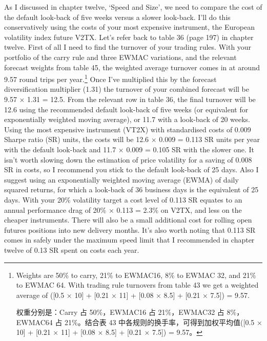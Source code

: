 \begin{englishblock} As I discussed in chapter twelve, ‘Speed and Size', we need to compare the cost of the default look-back of five weeks versus a slower look-back. I'll do this conservatively using the costs of your most expensive instrument, the European volatility index future V2TX. Let's refer back to table 36 (page 197) in chapter twelve. First of all I need to find the turnover of your trading rules. With your portfolio of the carry rule and three EWMAC variations, and the relevant forecast weights from table 45, the weighted average turnover comes in at around 9.57 round trips per year.\footnote{Weights are 50\% to carry, 21\% to EWMAC16, 8\% to EWMAC 32, and 21\% to EWMAC 64. With trading rule turnovers from table 43 we get a weighted average of ([0.5 × 10] + [0.21 × 11] + [0.08 × 8.5] + [0.21 × 7.5]) = 9.57. \par 权重分别是：Carry 占 50\%，EWMAC16 占 21\%，EWMAC32 占 8\%，EWMAC64 占 21\%。结合表 43 中各规则的换手率，可得到加权平均值([0.5 × 10] + [0.21 × 11] + [0.08 × 8.5] + [0.21 × 7.5]) = 9.57。} Once I've multiplied this by the forecast diversification multiplier (1.31) the turnover of your combined forecast will be 9.57 × 1.31 = 12.5. From the relevant row in table 36, the final turnover will be 12.6 using the recommended default look-back of five weeks (or equivalent for exponentially weighted moving average), or 11.7 with a look-back of 20 weeks. Using the most expensive instrument (VT2X) with standardised costs of 0.009 Sharpe ratio (SR) units, the costs will be 12.6 × 0.009 = 0.113 SR units per year with the default look-back and 11.7 × 0.009 = 0.105 SR with the slower one. It isn't worth slowing down the estimation of price volatility for a saving of 0.008 SR in costs, so I recommend you stick to the default look-back of 25 days. Also I suggest using an exponentially weighted moving average (EWMA) of daily squared returns, for which a look-back of 36 business days is the equivalent of 25 days. With your 20\% volatility target a cost level of 0.113 SR equates to an annual performance drag of 20\% × 0.113 = 2.3\% on V2TX, and less on the cheaper instruments. There will also be a small additional cost for rolling open futures positions into new delivery months. It's also worth noting that 0.113 SR comes in safely under the maximum speed limit that I recommended in chapter twelve of 0.13 SR spent on costs each year. \end{englishblock}

